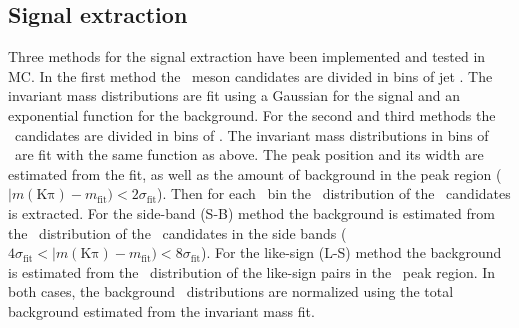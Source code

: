 \subsection{Signal extraction}
Three methods for the signal extraction have been implemented and tested in MC.
In the first method the \Dzero\ meson candidates are divided in bins of jet \pt. The invariant mass distributions
are fit using a Gaussian for the signal and an exponential function for the background.
For the second and third methods the \Dzero\ candidates are divided in bins of \ptd. 
The invariant mass distributions in bins of \ptd\ are fit with the same function as above. The
peak position and its width are estimated from the fit, as well as the amount of background in the peak region ($|m(\mathrm{K\pi})-m_{\mathrm{fit}}) < 2\sigma_{\mathrm{fit}}$).
Then for each \ptd\ bin the \ptchjet\ distribution of the \Dzero\ candidates is extracted.
For the side-band (S-B) method the background is estimated from the \ptchjet\ distribution of the \Dzero\ candidates in the side bands ($4\sigma_{\mathrm{fit}} < |m(\mathrm{K\pi})-m_{\mathrm{fit}}) < 8\sigma_{\mathrm{fit}}$).
For the like-sign (L-S) method the background is estimated from the \ptchjet\ distribution of the like-sign pairs in the \Dzero\ peak region.
In both cases, the background \ptchjet\ distributions are normalized using the total background estimated from the invariant mass fit.
